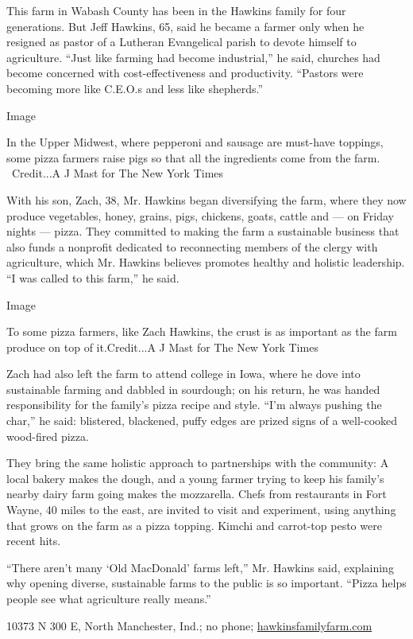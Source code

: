 This farm in Wabash County has been in the Hawkins family for four
generations. But Jeff Hawkins, 65, said he became a farmer only when he
resigned as pastor of a Lutheran Evangelical parish to devote himself to
agriculture. ``Just like farming had become industrial,'' he said,
churches had become concerned with cost-effectiveness and productivity.
``Pastors were becoming more like C.E.O.s and less like shepherds.''

Image

In the Upper Midwest, where pepperoni and sausage are must-have
toppings, some pizza farmers raise pigs so that all the ingredients come
from the farm.~ ~Credit...A J Mast for The New York Times

With his son, Zach, 38, Mr. Hawkins began diversifying the farm, where
they now produce vegetables, honey, grains, pigs, chickens, goats,
cattle and --- on Friday nights --- pizza. They committed to making the
farm a sustainable business that also funds a nonprofit dedicated to
reconnecting members of the clergy with agriculture, which Mr. Hawkins
believes promotes healthy and holistic leadership. ``I was called to
this farm,'' he said.

Image

To some pizza farmers, like Zach Hawkins, the crust is as important as
the farm produce on top of it.Credit...A J Mast for The New York Times

Zach had also left the farm to attend college in Iowa, where he dove
into sustainable farming and dabbled in sourdough; on his return, he was
handed responsibility for the family's pizza recipe and style. ``I'm
always pushing the char,'' he said: blistered, blackened, puffy edges
are prized signs of a well-cooked wood-fired pizza.

They bring the same holistic approach to partnerships with the
community: A local bakery makes the dough, and a young farmer trying to
keep his family's nearby dairy farm going makes the mozzarella. Chefs
from restaurants in Fort Wayne, 40 miles to the east, are invited to
visit and experiment, using anything that grows on the farm as a pizza
topping. Kimchi and carrot-top pesto were recent hits.

``There aren't many `Old MacDonald' farms left,'' Mr. Hawkins said,
explaining why opening diverse, sustainable farms to the public is so
important. ``Pizza helps people see what agriculture really means.''

10373 N 300 E, North Manchester, Ind.; no phone;
\href{http://www.hawkinsfamilyfarm.com/}{hawkinsfamilyfarm.com}

